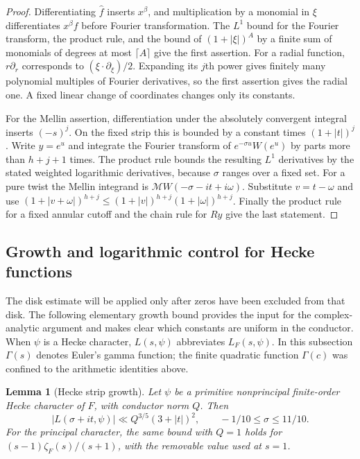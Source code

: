 \documentclass[11pt,a4paper]{article}
\numberwithin{equation}{section}
\numberwithin{figure}{section}
\newtheorem{lemma}[theorem]{Lemma}
\theoremstyle{definition}
\theoremstyle{remark}
\begin{document}
\begin{proof}
Differentiating $\widehat f$ inserts $x^\beta$, and multiplication by a
monomial in $\xi$ differentiates $x^\beta f$ before Fourier transformation.
The $L^1$ bound for the Fourier transform, the product rule, and the bound of
$(1+|\xi|)^A$ by a finite sum of monomials of degrees at most $\lceil A\rceil$
give the first assertion.  For a radial function,
$r\partial_r$ corresponds to $(\xi\cdot\partial_\xi)/2$.  Expanding its
$j$th power gives finitely many polynomial multiples of Fourier derivatives,
so the first assertion gives the radial one.  A fixed linear change of
coordinates changes only its constants.

For the Mellin assertion, differentiation under the absolutely convergent
integral inserts $(-s)^j$.  On the fixed strip this is bounded by a constant
times $(1+|t|)^j$.  Write $y=e^u$ and integrate the Fourier transform of
$e^{-\sigma u}W(e^u)$ by parts more than $h+j+1$ times.  The product rule
bounds the resulting $L^1$ derivatives by the stated weighted logarithmic
derivatives, because $\sigma$ ranges over a fixed set.  For a pure twist the
Mellin integrand is $\mathcal MW(-\sigma-it+i\omega)$.  Substitute
$v=t-\omega$ and use
$(1+|v+\omega|)^{h+j}\le(1+|v|)^{h+j}(1+|\omega|)^{h+j}$.
Finally the product rule for a fixed annular cutoff and the chain rule for
$Ry$ give the last statement.
\end{proof}

\subsection{Growth and logarithmic control for Hecke functions}

The disk estimate will be applied only after zeros have been excluded from
that disk.  The following elementary growth bound provides the input for the
complex-analytic argument and makes clear which constants are uniform in the
conductor.  When $\psi$ is a Hecke character, $L(s,\psi)$ abbreviates
$L_F(s,\psi)$.  In this subsection $\Gamma(s)$ denotes Euler's gamma function;
the finite quadratic function $\Gamma(c)$ was confined to the arithmetic
identities above.

\begin{lemma}[Hecke strip growth]\label{lem:hecke-strip-growth}
Let $\psi$ be a primitive nonprincipal finite-order Hecke character of $F$,
with conductor norm $Q$.  Then
\begin{equation}\label{eq:hecke-growth}
 |L(\sigma+it,\psi)|\ll Q^{3/5}(3+|t|)^2,
 \qquad-1/10\le\sigma\le11/10.
\end{equation}
For the principal character, the same bound with $Q=1$ holds for
$(s-1)\zeta_F(s)/(s+1)$, with the removable value used at $s=1$.
\end{lemma}
\end{document}
